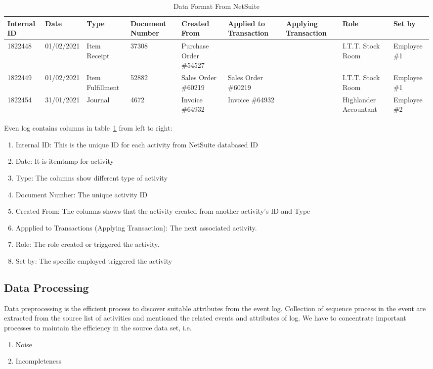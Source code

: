 \begin{table}[htb]
\scriptsize %
\begin{tabularx}{\textwidth}{|X|X|X|X|X|X|X|X|X|}
\hline
Internal ID & Date & Type & Document Number & Created From & Applied to Transaction & Applying Transaction & Role & Set by\\
\hline
1822448 & 01/02/2021 & Item Receipt &	37308 &	Purchase Order \#54527 &  &   & I.T.T. Stock Room & Employee \#1\\
\hline
1822449 & 01/02/2021 & Item Fulfillment &	52882 &	Sales Order \#60219 & Sales Order \#60219  &   & I.T.T. Stock Room & Employee \#1\\
\hline
1822454 &	31/01/2021 &	Journal &	4672 &	Invoice \#64932 &	Invoice \#64932 &	& Highlander Accountant &	Employee \#2 \\
\hline

\end{tabularx}
\caption{Data Format From NetSuite}
\label{table:dataformat}
\end{table}


Even log contains columns in table~\ref{table:dataformat} from left to right:
\begin{enumerate}
    \item  Internal ID: This is the unique ID for each activity from NetSuite databased ID
    \item Date: It is itemtamp for activity
    \item Type: The columns show different type of activity
    \item Document Number: The unique activity ID
    \item Created From: The columns shows that the activity created from another activity's ID and Type
    \item Appplied to Transactions (Applying Transaction): The next associated activity.
    \item Role: The role created or triggered the activity.
    \item Set by: The specific employed triggered the activity
\end{enumerate}

\subsection{Data Processing}
Data preprocessing is the efficient process to discover suitable attributes from the event log. Collection of sequence process in the event are extracted from the source list of activities and mentioned the related events and attributes of log. We have to concentrate important processes to maintain the efficiency in the source data set, i.e.
\begin{enumerate}
    \item Noise
    \item Incompleteness
\end{enumerate}

